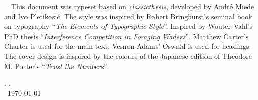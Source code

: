 \thispagestyle{empty}

\hfill

\vfill


\noindent \adftripleflourishright~~This document was typeset based on \emph{classicthesis}, developed by Andr\'e Miede and Ivo Pletikosić.
The style was inspired by Robert Bringhurst's seminal book on typography ``\emph{The Elements of Typographic Style}''.
Inspired by Wouter Vahl's PhD thesis ``\emph{Interference Competition in Foraging Waders}'', Matthew Carter's Charter is used for the main text; Vernon Adams' Oswald is used for headings.
The cover design is inspired by the colours of the Japanese edition of Theodore M. Porter's ``\emph{Trust the Numbers}''.

\bigskip

\noindent\finalVersionString

\noindent\myName. \textit{\myTitle.}%
\\
\noindent \textcopyright\ \today

%
%
%
%
%
